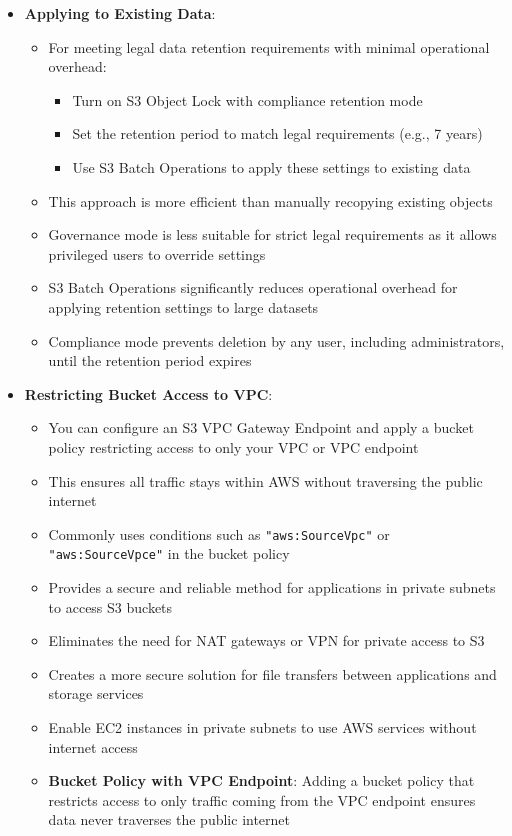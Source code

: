 \documentclass[11pt,a4paper]{report}
\begin{document}
\begin{itemize}
\begin{itemize}
\end{itemize}
  \item \textbf{Applying to Existing Data}:
\begin{itemize}
  \item For meeting legal data retention requirements with minimal operational overhead:
\begin{itemize}
  \item Turn on S3 Object Lock with compliance retention mode
  \item Set the retention period to match legal requirements (e.g., 7 years)
  \item Use S3 Batch Operations to apply these settings to existing data
\end{itemize}
  \item This approach is more efficient than manually recopying existing objects
  \item Governance mode is less suitable for strict legal requirements as it allows privileged users to override settings
  \item S3 Batch Operations significantly reduces operational overhead for applying retention settings to large datasets
  \item Compliance mode prevents deletion by any user, including administrators, until the retention period expires
\end{itemize}
  \item \textbf{Restricting Bucket Access to VPC}:
\begin{itemize}
  \item You can configure an S3 VPC Gateway Endpoint and apply a bucket policy restricting access to only your VPC or VPC endpoint
  \item This ensures all traffic stays within AWS without traversing the public internet
  \item Commonly uses conditions such as \texttt{"aws:SourceVpc"} or \texttt{"aws:SourceVpce"} in the bucket policy
  \item Provides a secure and reliable method for applications in private subnets to access S3 buckets
  \item Eliminates the need for NAT gateways or VPN for private access to S3
  \item Creates a more secure solution for file transfers between applications and storage services
  \item Enable EC2 instances in private subnets to use AWS services without internet access
  \item \textbf{Bucket Policy with VPC Endpoint}: Adding a bucket policy that restricts access to only traffic coming from the VPC endpoint ensures data never traverses the public internet

\end{itemize}
\end{itemize}
\end{document}
